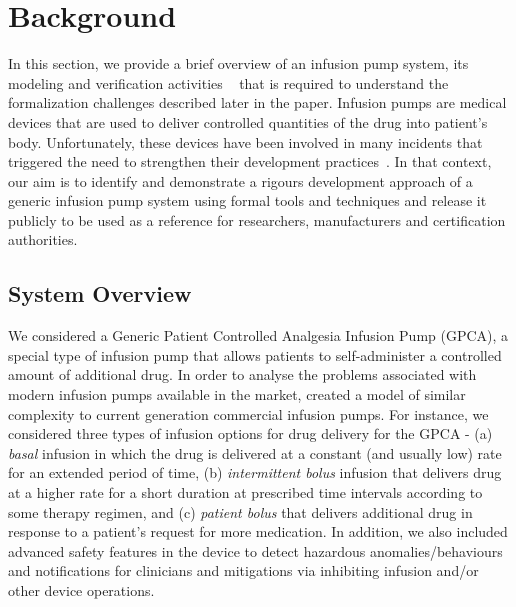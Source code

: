 \section{Background}
\label{sec:gpca-overview}

In this section, we provide a brief overview of an infusion pump system, its modeling and verification activities ~\cite{hilt2013, req2code} that is required to understand the formalization challenges described later in the paper. Infusion pumps are medical devices that are used to deliver controlled quantities of the drug into patient's body. Unfortunately, these devices have been involved in many incidents that triggered the need to strengthen their development practices~\cite{fda2010whitepaper}. In that context, our aim is to identify and demonstrate a rigours development approach of a generic infusion pump system using formal tools and techniques and release it publicly to be used as a reference for researchers, manufacturers and certification authorities.

\subsection {System Overview}
We considered a Generic Patient Controlled Analgesia Infusion Pump (GPCA), a special type of infusion pump that allows patients to self-administer a controlled amount of additional drug. %
In order to analyse the problems associated with modern infusion pumps available in the market, created a model of similar complexity to current generation commercial infusion pumps. For instance, we considered three types of infusion options for drug delivery for the GPCA - (a) \emph{basal} infusion in which the drug is delivered at a constant (and usually low) rate for an extended period of
time, (b) \emph{intermittent bolus} infusion that delivers drug at a higher rate for a short duration at prescribed time intervals according to some therapy regimen, and (c) \emph{patient bolus} that delivers additional drug in response to a patient's request for more medication. In addition, we also included advanced safety features in the device to detect hazardous anomalies/behaviours and notifications for clinicians and mitigations via inhibiting infusion and/or other device operations.

